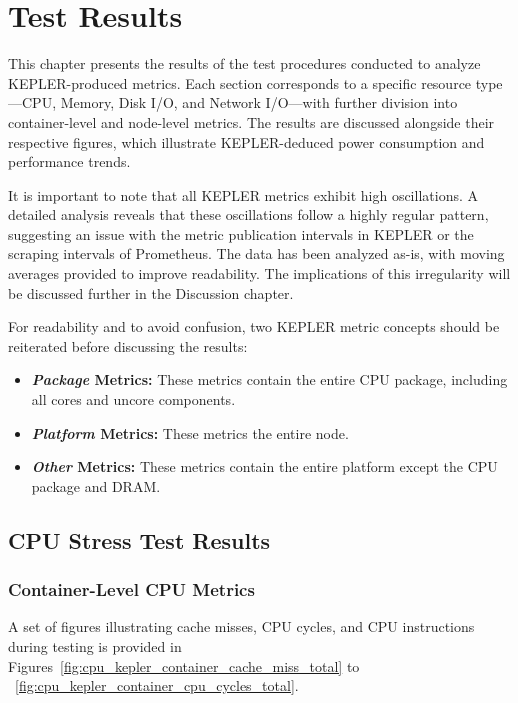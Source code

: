 
\chapter{Test Results}
\label{Chapter5}

This chapter presents the results of the test procedures conducted to analyze KEPLER-produced metrics. Each section corresponds to a specific resource type—CPU, Memory, Disk I/O, and Network I/O—with further division into container-level and node-level metrics. The results are discussed alongside their respective figures, which illustrate KEPLER-deduced power consumption and performance trends. 

It is important to note that all KEPLER metrics exhibit high oscillations. A detailed analysis reveals that these oscillations follow a highly regular pattern, suggesting an issue with the metric publication intervals in KEPLER or the scraping intervals of Prometheus. The data has been analyzed as-is, with moving averages provided to improve readability. The implications of this irregularity will be discussed further in the Discussion chapter.

For readability and to avoid confusion, two KEPLER metric concepts should be reiterated before discussing the results:
\begin{itemize}
    \item \textbf{\textit{Package} Metrics:} These metrics contain the entire CPU package, including all cores and uncore components.
    \item \textbf{\textit{Platform} Metrics:} These metrics the entire node.
    \item \textbf{\textit{Other} Metrics:} These metrics contain the entire platform except the CPU package and DRAM.
\end{itemize}

\section{CPU Stress Test Results}
\subsection{Container-Level CPU Metrics}

A set of figures illustrating cache misses, CPU cycles, and CPU instructions during testing is provided in Figures~\ref{fig:cpu_kepler_container_cache_miss_total} to ~\ref{fig:cpu_kepler_container_cpu_cycles_total}.

